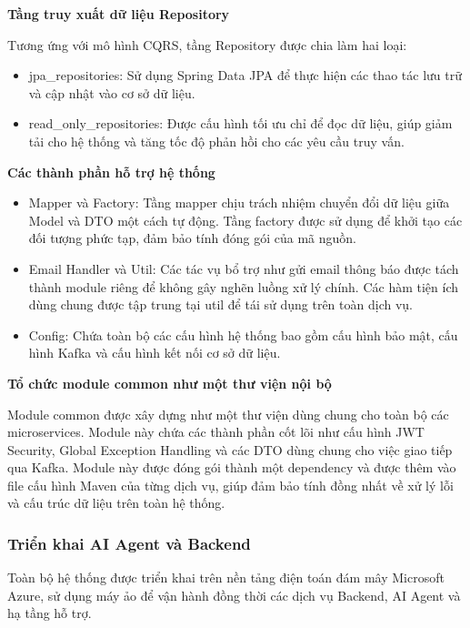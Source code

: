 \textbf{Tầng truy xuất dữ liệu Repository}

Tương ứng với mô hình CQRS, tầng Repository được chia làm hai loại:

\begin{itemize}
    \item jpa\_repositories: Sử dụng Spring Data JPA để thực hiện các thao tác lưu trữ và cập nhật vào cơ sở dữ liệu.
    \item read\_only\_repositories: Được cấu hình tối ưu chỉ để đọc dữ liệu, giúp giảm tải cho hệ thống và tăng tốc độ phản hồi cho các yêu cầu truy vấn.
\end{itemize}

\textbf{Các thành phần hỗ trợ hệ thống}

\begin{itemize}
    \item Mapper và Factory: Tầng mapper chịu trách nhiệm chuyển đổi dữ liệu giữa Model và DTO một cách tự động. Tầng factory được sử dụng để khởi tạo các đối tượng phức tạp, đảm bảo tính đóng gói của mã nguồn.
    \item Email Handler và Util: Các tác vụ bổ trợ như gửi email thông báo được tách thành module riêng để không gây nghẽn luồng xử lý chính. Các hàm tiện ích dùng chung được tập trung tại util để tái sử dụng trên toàn dịch vụ.
    \item Config: Chứa toàn bộ các cấu hình hệ thống bao gồm cấu hình bảo mật, cấu hình Kafka và cấu hình kết nối cơ sở dữ liệu.
\end{itemize}

\textbf{Tổ chức module common như một thư viện nội bộ}

Module common được xây dựng như một thư viện dùng chung cho toàn bộ các microservices. Module này chứa các thành phần cốt lõi như cấu hình JWT Security, Global Exception Handling và các DTO dùng chung cho việc giao tiếp qua Kafka. Module này được đóng gói thành một dependency và được thêm vào file cấu hình Maven của từng dịch vụ, giúp đảm bảo tính đồng nhất về xử lý lỗi và cấu trúc dữ liệu trên toàn hệ thống.

\subsubsection{Triển khai AI Agent và Backend}

Toàn bộ hệ thống được triển khai trên nền tảng điện toán đám mây Microsoft Azure, sử dụng máy ảo để vận hành đồng thời các dịch vụ Backend, AI Agent và hạ tầng hỗ trợ.

